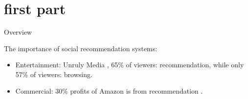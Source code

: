 \section{first part}
\begin{frame}[noframenumbering]{Overview}
\end{frame}

\begin{frame}{\insertsection}
	The importance of social recommendation systems:
	\vspace{1em}
	\begin{itemize}
		\setlength\itemsep{1em}
		\item Entertainment: Unruly Media , 65\% of viewers: recommendation, while only 57\% of viewers:  browsing.
		\item Commercial: 30\% profits of Amazon is from recommendation .
	\end{itemize}

\end{frame}
